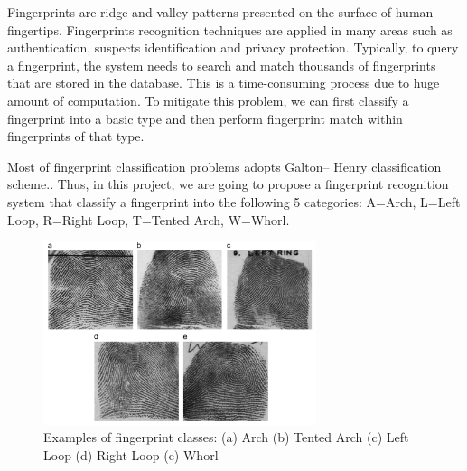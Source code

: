 

Fingerprints are ridge and valley patterns presented on the surface of human fingertips.
%
Fingerprints recognition techniques are applied in many areas such as authentication, suspects identification and privacy protection.
%
Typically, to query a fingerprint, the system needs to search and match thousands of fingerprints that are stored in the database. This is a time-consuming process due to huge amount of computation.
%
To mitigate this problem, we can first classify a fingerprint into a basic type and then perform fingerprint match within fingerprints of that type.
%

%
Most of fingerprint classification problems adopts Galton– Henry classification scheme.\cite{henry1905classification}. Thus, in this project, we are going to propose a fingerprint recognition system that classify a fingerprint into the following 5 categories:
%
A=Arch, L=Left Loop, R=Right Loop, T=Tented Arch, W=Whorl.
%
\begin{figure}[!ht]
	\begin{center}
		\includegraphics[width=8cm]{fig/Fingerprint_classes.png}
	\end{center}
	\caption{Examples of fingerprint classes: (a) Arch (b) Tented Arch (c) Left Loop (d) Right Loop  (e) Whorl \cite{cao2013fingerprint}} 
	\label{fig.fingerprint_classes}
\end{figure}

